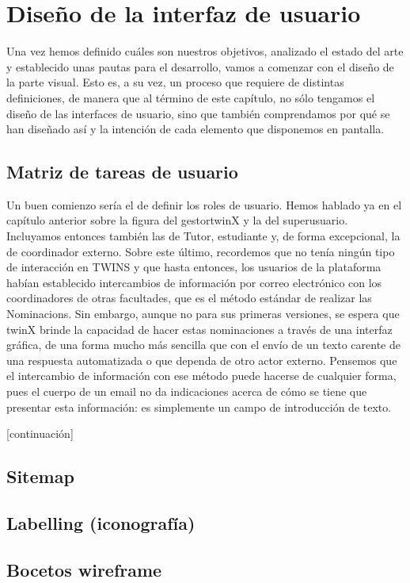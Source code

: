 \chapter{Diseño de la interfaz de usuario}

Una vez hemos definido cuáles son nuestros objetivos, analizado el estado del arte y establecido unas pautas para el desarrollo, vamos a comenzar con el diseño de la parte visual. Esto es, a su vez, un proceso que requiere de distintas definiciones, de manera que al término de este capítulo, no sólo tengamos el diseño de las interfaces de usuario, sino que también comprendamos por qué se han diseñado así y la intención de cada elemento que disponemos en pantalla.

\section{Matriz de tareas de usuario}

Un buen comienzo sería el de definir los roles de usuario. Hemos hablado ya en el capítulo anterior sobre la figura del \gls{gestortwinX} y la del \gls{superusuario}. Incluyamos entonces también las de \gls{Tutor}, estudiante y, de forma excepcional, la de coordinador externo. Sobre este último, recordemos que no tenía ningún tipo de interacción en TWINS y que hasta entonces, los usuarios de la plataforma habían establecido intercambios de información por correo electrónico con los coordinadores de otras facultades, que es el método estándar de realizar las \glspl{Nominacion}. Sin embargo, aunque no para sus primeras versiones, se espera que twinX brinde la capacidad de hacer estas nominaciones a través de una interfaz gráfica, de una forma mucho más sencilla que con el envío de un texto carente de una respuesta automatizada o que dependa de otro actor externo. Pensemos que el intercambio de información con ese método puede hacerse de cualquier forma, pues el cuerpo de un email no da indicaciones acerca de cómo se tiene que presentar esta información: es simplemente un campo de introducción de texto.

[continuación]

\section{Sitemap}
\section{Labelling (iconografía)}
\section{Bocetos wireframe}

